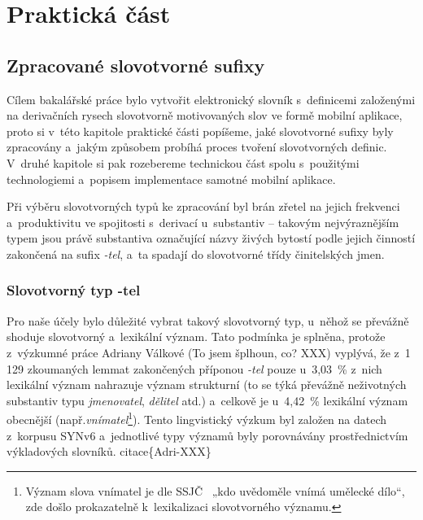 \part{Praktická část}

\hypertarget{zpracovanuxe9-slovotvornuxe9-sufixy}{%
\chapter{Zpracované slovotvorné
sufixy}\label{zpracovanuxe9-slovotvornuxe9-sufixy}}

Cílem bakalářské práce bylo vytvořit elektronický slovník s~definicemi
založenými na derivačních rysech slovotvorně motivovaných slov ve formě
mobilní aplikace, proto si v~této kapitole praktické části popíšeme,
jaké slovotvorné sufixy byly zpracovány a~jakým způsobem probíhá proces
tvoření slovotvorných definic. V~druhé kapitole si pak rozebereme
technickou část spolu s~použitými technologiemi a~popisem implementace
samotné mobilní aplikace.

Při výběru slovotvorných typů ke zpracování byl brán zřetel na jejich
frekvenci a~produktivitu ve spojitosti s~derivací u~substantiv --
takovým nejvýraznějším typem jsou právě substantiva označující názvy
živých bytostí podle jejich činností zakončená na sufix \emph{-tel},
a~ta spadají do slovotvorné třídy činitelských jmen.
\parencite[17]{dokulil67}

\hypertarget{slovotvornuxfd-typ--tel}{%
\section{Slovotvorný typ -tel}\label{slovotvornuxfd-typ--tel}}

Pro naše účely bylo důležité vybrat takový slovotvorný typ, u~něhož se
převážně shoduje slovotvorný a~lexikální význam. Tato podmínka je
splněna, protože z~výzkumné práce Adriany Válkové (To jsem šplhoun, co?
XXX) vyplývá, že z~1 129 zkoumaných lemmat zakončených příponou
\emph{-tel} pouze u~3,03~\% z~nich lexikální význam nahrazuje význam
strukturní (to se týká převážně neživotných substantiv typu
\emph{jmenovatel}, \emph{dělitel} atd.) a~celkově je u~4,42~\% lexikální
význam obecnější
(např.\emph{vnímatel}\footnote{Význam slova vnímatel je dle SSJČ~\parencite{ssjc} „kdo uvědoměle vnímá umělecké dílo“, zde došlo prokazatelně k~lexikalizaci slovotvorného významu.}).
Tento lingvistický výzkum byl založen na datech z~korpusu SYNv6
a~jednotlivé typy významů byly porovnávány prostřednictvím výkladových
slovníků. citace\{Adri-XXX\}

